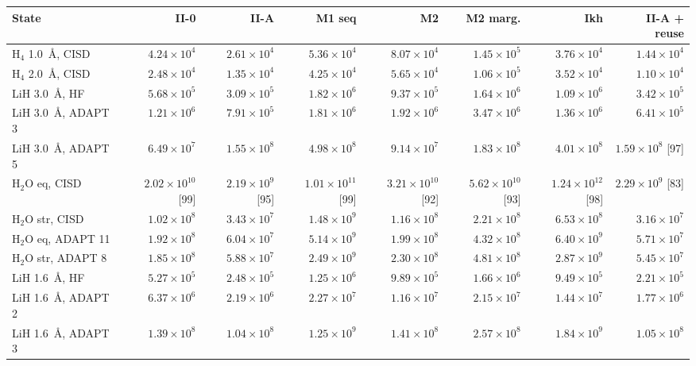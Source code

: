 \begin{tabular}{@{}lrrrrrrr@{}}
\toprule
State & II-0 & II-A & M1 seq & M2 & M2 marg. & Ikh & II-A + reuse \\
\midrule
H$_4$ 1.0~\AA, CISD & $4.24\times10^{4}$ & $2.61\times10^{4}$ & $5.36\times10^{4}$ & $8.07\times10^{4}$ & $1.45\times10^{5}$ & $3.76\times10^{4}$ & $1.44\times10^{4}$ \\
H$_4$ 2.0~\AA, CISD & $2.48\times10^{4}$ & $1.35\times10^{4}$ & $4.25\times10^{4}$ & $5.65\times10^{4}$ & $1.06\times10^{5}$ & $3.52\times10^{4}$ & $1.10\times10^{4}$ \\
LiH 3.0~\AA, HF & $5.68\times10^{5}$ & $3.09\times10^{5}$ & $1.82\times10^{6}$ & $9.37\times10^{5}$ & $1.64\times10^{6}$ & $1.09\times10^{6}$ & $3.42\times10^{5}$ \\
LiH 3.0~\AA, ADAPT 3 & $1.21\times10^{6}$ & $7.91\times10^{5}$ & $1.81\times10^{6}$ & $1.92\times10^{6}$ & $3.47\times10^{6}$ & $1.36\times10^{6}$ & $6.41\times10^{5}$ \\
LiH 3.0~\AA, ADAPT 5 & $6.49\times10^{7}$ & $1.55\times10^{8}$ & $4.98\times10^{8}$ & $9.14\times10^{7}$ & $1.83\times10^{8}$ & $4.01\times10^{8}$ & $1.59\times10^{8}$ [97] \\
H$_2$O eq, CISD & $2.02\times10^{10}$ [99] & $2.19\times10^{9}$ [95] & $1.01\times10^{11}$ [99] & $3.21\times10^{10}$ [92] & $5.62\times10^{10}$ [93] & $1.24\times10^{12}$ [98] & $2.29\times10^{9}$ [83] \\
H$_2$O str, CISD & $1.02\times10^{8}$ & $3.43\times10^{7}$ & $1.48\times10^{9}$ & $1.16\times10^{8}$ & $2.21\times10^{8}$ & $6.53\times10^{8}$ & $3.16\times10^{7}$ \\
H$_2$O eq, ADAPT 11 & $1.92\times10^{8}$ & $6.04\times10^{7}$ & $5.14\times10^{9}$ & $1.99\times10^{8}$ & $4.32\times10^{8}$ & $6.40\times10^{9}$ & $5.71\times10^{7}$ \\
H$_2$O str, ADAPT 8 & $1.85\times10^{8}$ & $5.88\times10^{7}$ & $2.49\times10^{9}$ & $2.30\times10^{8}$ & $4.81\times10^{8}$ & $2.87\times10^{9}$ & $5.45\times10^{7}$ \\
LiH 1.6~\AA, HF & $5.27\times10^{5}$ & $2.48\times10^{5}$ & $1.25\times10^{6}$ & $9.89\times10^{5}$ & $1.66\times10^{6}$ & $9.49\times10^{5}$ & $2.21\times10^{5}$ \\
LiH 1.6~\AA, ADAPT 2 & $6.37\times10^{6}$ & $2.19\times10^{6}$ & $2.27\times10^{7}$ & $1.16\times10^{7}$ & $2.15\times10^{7}$ & $1.44\times10^{7}$ & $1.77\times10^{6}$ \\
LiH 1.6~\AA, ADAPT 3 & $1.39\times10^{8}$ & $1.04\times10^{8}$ & $1.25\times10^{9}$ & $1.41\times10^{8}$ & $2.57\times10^{8}$ & $1.84\times10^{9}$ & $1.05\times10^{8}$ \\

\end{tabular}
